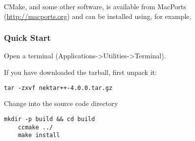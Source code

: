 \begin{tipbox}
CMake, and some other software, is available from MacPorts
(\url{http://macports.org}) and can be installed using, for example,

\noindent\usebox\installationOSXMacPortsTip
\end{tipbox}


\subsubsection{Quick Start}
Open a terminal (Applications->Utilities->Terminal).

If you have downloaded the tarball, first unpack it:
\begin{lstlisting}[style=BashInputStyle]
    tar -zxvf nektar++-4.0.0.tar.gz
\end{lstlisting}
Change into the  source code directory
\begin{lstlisting}[style=BashInputStyle]
    mkdir -p build && cd build 
    ccmake ../
    make install
\end{lstlisting}

